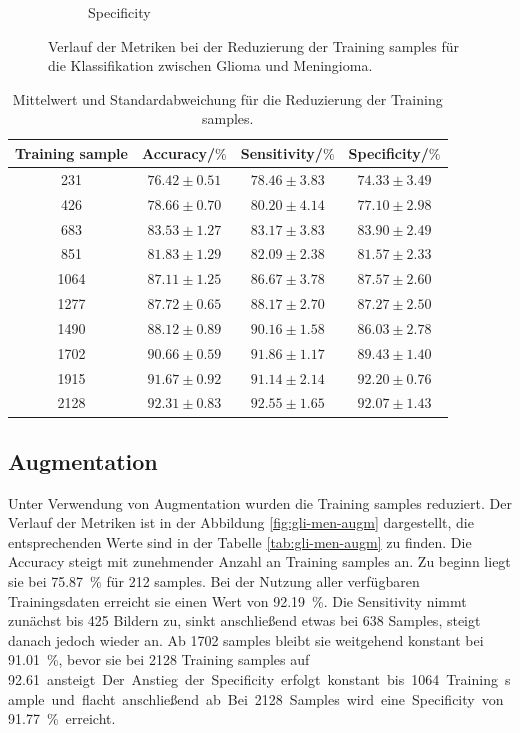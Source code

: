 \begin{figure}[H]
\begin{subfigure}[b]{0.48\textwidth}
    \caption{Specificity}
    \label{fig:gli-men-spec}
  \end{subfigure}
  \caption{Verlauf der Metriken bei der Reduzierung der Training samples für die Klassifikation zwischen Glioma und Meningioma.}
  \label{fig:gli-men-reduktion}
\end{figure}
\begin{table}[H]
    \centering
    {\small
        \begin{tabular}{cccc}
            \toprule
            Training sample & Accuracy/$\%$ & Sensitivity/$\%$ & Specificity/$\%$\\
            \midrule
            231  & $76.42 \pm 0.51 $ & $78.46 \pm 3.83$ & $74.33 \pm 3.49$\\
            426  & $78.66 \pm 0.70 $ & $80.20 \pm 4.14$ & $77.10 \pm 2.98$\\
            683  & $83.53 \pm 1.27 $ & $83.17 \pm 3.83$ & $83.90 \pm 2.49$\\
            851  & $81.83 \pm 1.29 $ & $82.09 \pm 2.38$ & $81.57 \pm 2.33$\\
            1064 & $87.11 \pm 1.25 $ & $86.67 \pm 3.78$ & $87.57 \pm 2.60$\\
            1277 & $87.72 \pm 0.65 $ & $88.17 \pm 2.70$ & $87.27 \pm 2.50$\\
            1490 & $88.12 \pm 0.89 $ & $90.16 \pm 1.58$ & $86.03 \pm 2.78$\\
            1702 & $90.66 \pm 0.59 $ & $91.86 \pm 1.17$ & $89.43 \pm 1.40$\\
            1915 & $91.67 \pm 0.92 $ & $91.14 \pm 2.14$ & $92.20 \pm 0.76$\\
            2128 & $92.31 \pm 0.83 $ & $92.55 \pm 1.65$ & $92.07 \pm 1.43$\\            
            \bottomrule
        \end{tabular}}
  \caption{Mittelwert und Standardabweichung für die Reduzierung der Training samples.}
  \label{tab:Red-gli-men}
\end{table}
\subsection{Augmentation}
Unter Verwendung von Augmentation wurden die Training samples reduziert.
Der Verlauf der Metriken ist in der Abbildung \ref{fig:gli-men-augm} dargestellt,
die entsprechenden Werte sind in der Tabelle \ref{tab:gli-men-augm} zu finden.
Die Accuracy steigt mit zunehmender Anzahl an Training samples an.
Zu beginn liegt sie bei \SI{75.87}{\percent} für 212 samples. 
Bei der Nutzung aller verfügbaren Trainingsdaten erreicht sie einen Wert von \SI{92.19}{\percent}.
Die Sensitivity nimmt zunächst bis 425 Bildern zu, sinkt anschließend etwas bei 638 Samples, steigt danach jedoch wieder an.
Ab 1702 samples bleibt sie weitgehend konstant bei \SI{91.01}{\%}, bevor sie bei 2128 Training samples auf \SI{92.61} ansteigt. 
Der Anstieg der Specificity erfolgt konstant bis 1064 Training sample und flacht anschließend ab.
Bei 2128 Samples wird eine Specificity von \SI{91.77}{\%} erreicht.

